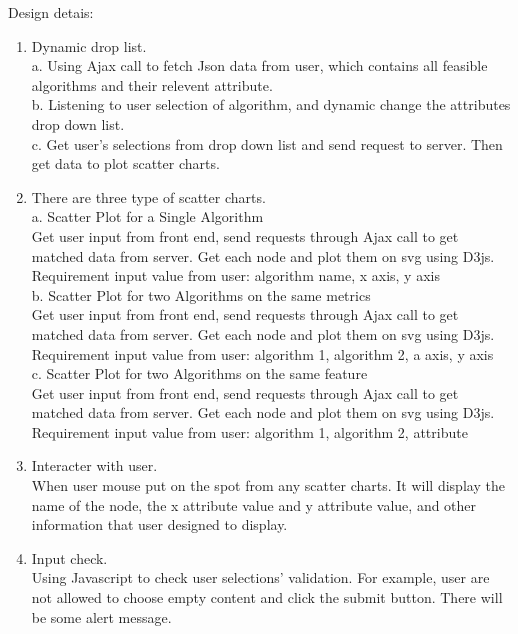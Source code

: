 \documentclass[11pt,letter]{article}
\begin{document}
Design detais:
\begin{enumerate}
\item Dynamic drop list.\\
a. Using Ajax call to fetch Json data from user, which contains all feasible algorithms and their relevent attribute.\\
b. Listening to user selection of algorithm, and dynamic change the attributes drop down list.\\
c. Get user's selections from drop down list and send request to server. Then get data to plot scatter charts.\\

\item There are three type of scatter charts.\\
a. Scatter Plot for a Single Algorithm\\
Get user input from front end, send requests through Ajax call to get matched data from server. Get each node and plot them on svg using D3js.\\
Requirement input value from user: {algorithm name, x axis, y axis}\\

b. Scatter Plot for two Algorithms on the same metrics\\
Get user input from front end, send requests through Ajax call to get matched data from server. Get each node and plot them on svg using D3js.\\
Requirement input value from user: {algorithm 1, algorithm 2, a axis, y axis}\\

c. Scatter Plot for two Algorithms on the same feature\\
Get user input from front end, send requests through Ajax call to get matched data from server. Get each node and plot them on svg using D3js.\\
Requirement input value from user: {algorithm 1, algorithm 2, attribute}\\

\item Interacter with user. \\
When user mouse put on the spot from any scatter charts. It will display the name of the node, the x attribute value and y attribute value, and other information that user designed to display. \\

\item Input check.\\
Using Javascript to check user selections' validation. For example, user are not allowed to choose empty content and click the submit button. There will be some alert message.\\

\end{enumerate}
\end{document}
